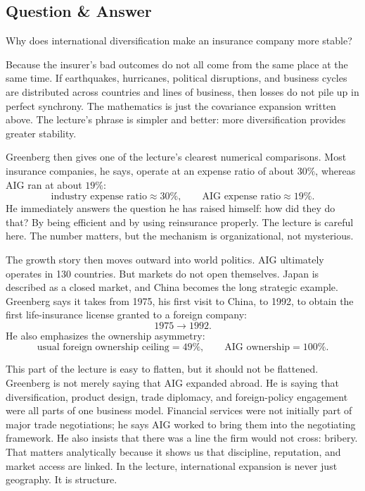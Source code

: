 \subsection{Question \& Answer}

Why does international diversification make an insurance company more stable?

Because the insurer's bad outcomes do not all come from the same place at the same time. If earthquakes, hurricanes, political disruptions, and business cycles are distributed across countries and lines of business, then losses do not pile up in perfect synchrony. The mathematics is just the covariance expansion written above. The lecture's phrase is simpler and better: more diversification provides greater stability.

Greenberg then gives one of the lecture's clearest numerical comparisons. Most insurance companies, he says, operate at an expense ratio of about \(30\%\), whereas AIG ran at about \(19\%\):
\begin{equation}
\text{industry expense ratio} \approx 30\%,
\qquad
\text{AIG expense ratio} \approx 19\%.
\end{equation}
He immediately answers the question he has raised himself: how did they do that? By being efficient and by using reinsurance properly. The lecture is careful here. The number matters, but the mechanism is organizational, not mysterious.

The growth story then moves outward into world politics. AIG ultimately operates in 130 countries. But markets do not open themselves. Japan is described as a closed market, and China becomes the long strategic example. Greenberg says it takes from 1975, his first visit to China, to 1992, to obtain the first life-insurance license granted to a foreign company:
\begin{equation}
1975 \longrightarrow 1992.
\end{equation}
He also emphasizes the ownership asymmetry:
\begin{equation}
\text{usual foreign ownership ceiling} = 49\%,
\qquad
\text{AIG ownership} = 100\%.
\end{equation}

This part of the lecture is easy to flatten, but it should not be flattened. Greenberg is not merely saying that AIG expanded abroad. He is saying that diversification, product design, trade diplomacy, and foreign-policy engagement were all parts of one business model. Financial services were not initially part of major trade negotiations; he says AIG worked to bring them into the negotiating framework. He also insists that there was a line the firm would not cross: bribery. That matters analytically because it shows us that discipline, reputation, and market access are linked. In the lecture, international expansion is never just geography. It is structure.

